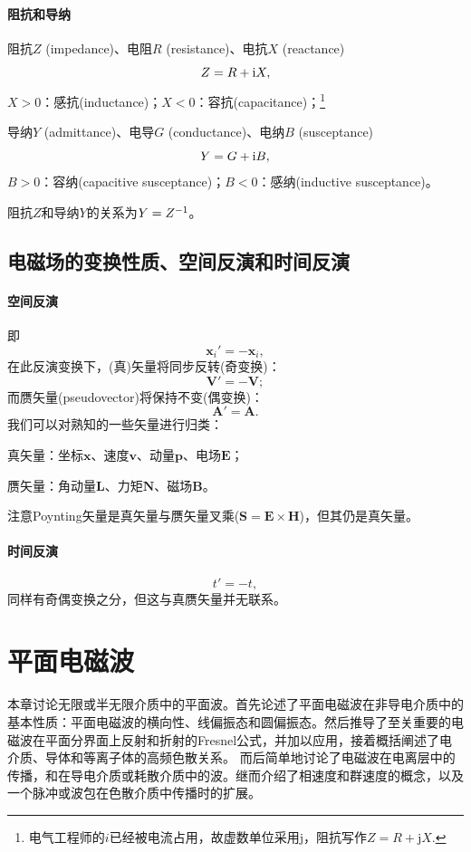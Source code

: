 \paragraph{阻抗和导纳}
阻抗$Z$ (impedance)、电阻$R$ (resistance)、电抗$X$ (reactance)
\[
    Z=R+\mathrm{i} X,
\]
$X>0$：感抗(inductance)；$X<0$：容抗(capacitance)；\footnote{电气工程师的$i$已经被电流占用，故虚数单位采用j，阻抗写作$Z=R+\mathrm j X.$}

导纳$Y$ (admittance)、电导$G$ (conductance)、电纳$B$ (susceptance)
\[
    Y=G+\mathrm{i} B,
\]
$B>0$：容纳(capacitive susceptance)；$B<0$：感纳(inductive susceptance)。

阻抗$Z$和导纳$Y$的关系为$Y=Z^{-1}$。
\subsection{电磁场的变换性质、空间反演和时间反演}
\paragraph{空间反演}
即
\[
    \bm x_i'=-\bm x_i,
\]
在此反演变换下，(真)矢量将同步反转(奇变换)：
\[
    \bm V'=-\bm V;
\]
而赝矢量(pseudovector)将保持不变(偶变换)：
\[
    \bm A'=\bm A.
\]
我们可以对熟知的一些矢量进行归类：
\begin{compactitem}
	\item 真矢量：坐标$\bm x$、速度$\bm v$、动量$\bm p$、电场$\bm E$；
	\item 赝矢量：角动量$\bm L$、力矩$\bm N$、磁场$\bm B$。
\end{compactitem}
注意Poynting矢量是真矢量与赝矢量叉乘($\bm S=\bm E\times\bm H$)，但其仍是真矢量。
\paragraph{时间反演}
\[
    t'=-t,
\]
同样有奇偶变换之分，但这与真赝矢量并无联系。
\clearpage
\section{平面电磁波}
\label{sec:plane wave}
本章讨论无限或半无限介质中的平面波。首先论述了平面电磁波在非导电介质中的基本性质：平面电磁波的横向性、线偏振态和圆偏振态。然后推导了至关重要的电磁波在平面分界面上反射和折射的Fresnel公式，并加以应用，接着概括阐述了电介质、导体和等离子体的高频色散关系。%
而后简单地讨论了电磁波在电离层中的传播，和在导电介质或耗散介质中的波。继而介绍了相速度和群速度的概念，以及一个脉冲或波包在色散介质中传播时的扩展。%
